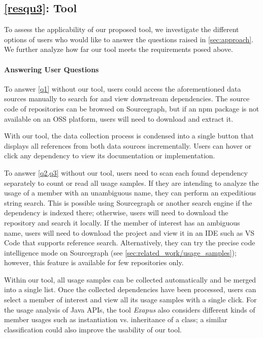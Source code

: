 \subsection{\ref{resqu3}: Tool}
\label{sec:evaluation/resqu3}

To assess the applicability of our proposed tool, we investigate the different options of users who would like to answer the questions raised in \cref{sec:approach}.
We further analyze how far our tool meets the requirements posed above.

\paragraph{Answering User Questions}

To answer \cref{q1} without our tool, users could access the aforementioned data sources manually to search for and view downstream dependencies.
The source code of repositories can be browsed on Sourcegraph, but if an npm package is not available on an OSS platform, users will need to download and extract it.

With our tool, the data collection process is condensed into a single button that displays all references from both data sources incrementally.
Users can hover or click any dependency to view its documentation or implementation.

To answer \cref{q2,q3} without our tool, users need to scan each found dependency separately to count or read all usage samples.
If they are intending to analyze the usage of a member with an unambiguous name, they can perform an expeditious string search.
This is possible using Sourcegraph or another search engine if the dependency is indexed there; otherwise, users will need to download the repository and search it locally.
If the member of interest has an ambiguous name, users will need to download the project and view it in an IDE such as VS Code that supports reference search.
Alternatively, they can try the precise code intelligence mode on Sourcegraph (see \cref{sec:related_work/usage_samples}); however, this feature is available for few repositories only.

Within our tool, all usage samples can be collected automatically and be merged into a single list.
Once the collected dependencies have been processed, users can select a member of interest and view all its usage samples with a single click.
For the usage analysis of Java APIs, the tool \emph{Exapus} \citep{de2013multi} also considers different kinds of member usages such as instantiation vs. inheritance of a class; a similar classification could also improve the usability of our tool.

